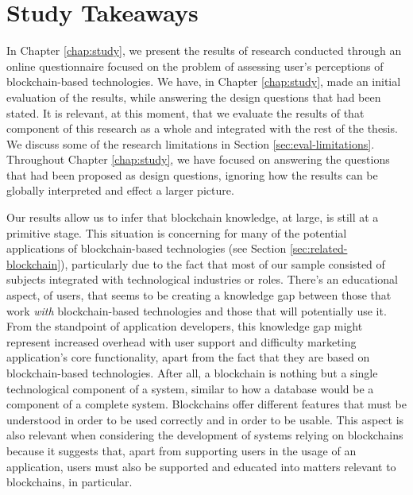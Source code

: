 \section{Study Takeaways}
\label{sec:eval-study}

In Chapter \ref{chap:study}, we present the results of research conducted through an online questionnaire focused on the problem of assessing user's perceptions of blockchain-based technologies. We have, in Chapter \ref{chap:study}, made an initial evaluation of the results, while answering the design questions that had been stated. It is relevant, at this moment, that we evaluate the results of that component of this research as a whole and integrated with the rest of the thesis. We discuss some of the research limitations in Section \ref{sec:eval-limitations}. Throughout Chapter \ref{chap:study}, we have focused on answering the questions that had been proposed as design questions, ignoring how the results can be globally interpreted and effect a larger picture.

Our results allow us to infer that blockchain knowledge, at large, is still at a primitive stage. This situation is concerning for many of the potential applications of blockchain-based technologies (see Section \ref{sec:related-blockchain}), particularly due to the fact that most of our sample consisted of subjects integrated with technological industries or roles. There's an educational aspect, of users, that seems to be creating a knowledge gap between those that work \emph{with} blockchain-based technologies and those that will potentially use it. From the standpoint of application developers, this knowledge gap might represent increased overhead with user support and difficulty marketing application's core functionality, apart from the fact that they are based on blockchain-based technologies. After all, a blockchain is nothing but a single technological component of a system, similar to how a database would be a component of a complete system. Blockchains offer different features that must be understood in order to be used correctly and in order to be usable. This aspect is also relevant when considering the development of systems relying on blockchains because it suggests that, apart from supporting users in the usage of an application, users must also be supported and educated into matters relevant to blockchains, in particular.

